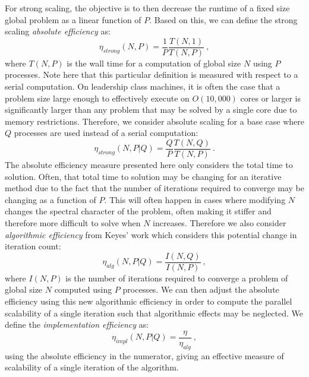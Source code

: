 For strong scaling, the objective is to then decrease the runtime of a
fixed size global problem as a linear function of $P$. Based on this,
we can define the strong scaling \textit{absolute efficiency} as:
\begin{equation}
  \eta_{strong}(N,P) = \frac{1}{P} \frac{T(N,1)}{T(N,P)}\:,
  \label{eq:strong_scaling_absolute}
\end{equation}
where $T(N,P)$ is the wall time for a computation of global size $N$
using $P$ processes. Note here that this particular definition is
measured with respect to a serial computation. On leadership class
machines, it is often the case that a problem size large enough to
effectively execute on $O(10,000)$ cores or larger is significantly
larger than any problem that may be solved by a single core due to
memory restrictions. Therefore, we consider absolute scaling for a
base case where $Q$ processes are used instead of a serial
computation:
\begin{equation}
  \eta_{strong}(N,P|Q) = \frac{Q}{P} \frac{T(N,Q)}{T(N,P)}\:.
  \label{eq:strong_scaling_absolute_ref}
\end{equation}
The absolute efficiency measure presented here only considers the
total time to solution. Often, that total time to solution may be
changing for an iterative method due to the fact that the number of
iterations required to converge may be changing as a function of
$P$. This will often happen in cases where modifying $N$ changes the
spectral character of the problem, often making it stiffer and
therefore more difficult to solve when $N$ increases. Therefore we
also consider \textit{algorithmic efficiency} from Keyes' work which
considers this potential change in iteration count:
\begin{equation}
  \eta_{alg}(N,P|Q) = \frac{I(N,Q)}{I(N,P)}\:,
  \label{eq:algorithmic_efficiency}
\end{equation}
where $I(N,P)$ is the number of iterations required to converge a
problem of global size $N$ computed using $P$ processes. We can then
adjust the absolute efficiency using this new algorithmic efficiency
in order to compute the parallel scalability of a single iteration
such that algorithmic effects may be neglected. We define the
\textit{implementation efficiency} as:
\begin{equation}
  \eta_{impl}(N,P|Q) = \frac{\eta}{\eta_{alg}}\:,
  \label{eq:implementation efficiency}
\end{equation}
using the absolute efficiency in the numerator, giving an effective
measure of scalability of a single iteration of the algorithm.

